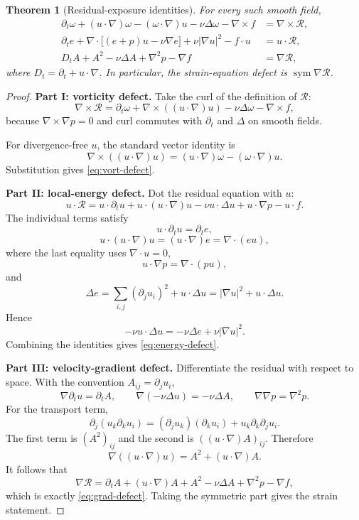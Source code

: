 \documentclass[12pt]{article}
\newtheorem{theorem}{Theorem}[section]
\newcommand{\Rres}{\mathcal R}
\newcommand{\sym}{\operatorname{sym}}
\begin{document}
\begin{theorem}[Residual-exposure identities]\label{thm:residualexposure}
For every such smooth field,
\begin{align}
\partial_t\omega+(u\cdot\nabla)\omega-(\omega\cdot\nabla)u
-\nu\Delta\omega-\nabla\times f
&=\nabla\times\Rres,\label{eq:vort-defect}\\
\partial_te+\nabla\cdot\bigl[(e+p)u-\nu\nabla e\bigr]
+\nu|\nabla u|^2-f\cdot u
&=u\cdot\Rres,\label{eq:energy-defect}\\
D_tA+A^2-\nu\Delta A+\nabla^2p-\nabla f
&=\nabla\Rres,\label{eq:grad-defect}
\end{align}
where $D_t=\partial_t+u\cdot\nabla$. In particular, the strain-equation defect is $\sym\nabla\Rres$.
\end{theorem}

\begin{proof}
\textbf{Part I: vorticity defect.}
Take the curl of the definition of $\Rres$:
\[
\nabla\times\Rres
=\partial_t\omega+\nabla\times((u\cdot\nabla)u)
-\nu\Delta\omega-\nabla\times f,
\]
because $\nabla\times\nabla p=0$ and curl commutes with $\partial_t$ and $\Delta$ on smooth fields.

For divergence-free $u$, the standard vector identity is
\[
\nabla\times((u\cdot\nabla)u)
=(u\cdot\nabla)\omega-(\omega\cdot\nabla)u.
\]
Substitution gives \eqref{eq:vort-defect}.

\textbf{Part II: local-energy defect.}
Dot the residual equation with $u$:
\[
u\cdot\Rres
=u\cdot\partial_tu
+u\cdot(u\cdot\nabla)u
-\nu u\cdot\Delta u
+u\cdot\nabla p-u\cdot f.
\]
The individual terms satisfy
\[
u\cdot\partial_tu=\partial_te,
\]
\[
u\cdot(u\cdot\nabla)u=(u\cdot\nabla)e=\nabla\cdot(eu),
\]
where the last equality uses $\nabla\cdot u=0$,
\[
u\cdot\nabla p=\nabla\cdot(pu),
\]
and
\[
\Delta e
=\sum_{i,j}(\partial_j u_i)^2+u\cdot\Delta u
=|\nabla u|^2+u\cdot\Delta u.
\]
Hence
\[
-\nu u\cdot\Delta u
=-\nu\Delta e+\nu|\nabla u|^2.
\]
Combining the identities gives \eqref{eq:energy-defect}.

\textbf{Part III: velocity-gradient defect.}
Differentiate the residual with respect to space. With the convention $A_{ij}=\partial_j u_i$,
\[
\nabla\partial_tu=\partial_tA,
\qquad
\nabla(-\nu\Delta u)=-\nu\Delta A,
\qquad
\nabla\nabla p=\nabla^2p.
\]
For the transport term,
\[
\partial_j(u_k\partial_k u_i)
=(\partial_j u_k)(\partial_k u_i)+u_k\partial_k\partial_j u_i.
\]
The first term is $(A^2)_{ij}$ and the second is $((u\cdot\nabla)A)_{ij}$. Therefore
\[
\nabla((u\cdot\nabla)u)=A^2+(u\cdot\nabla)A.
\]
It follows that
\[
\nabla\Rres
=\partial_tA+(u\cdot\nabla)A+A^2-\nu\Delta A+\nabla^2p-\nabla f,
\]
which is exactly \eqref{eq:grad-defect}. Taking the symmetric part gives the strain statement.
\end{proof}
\end{document}
